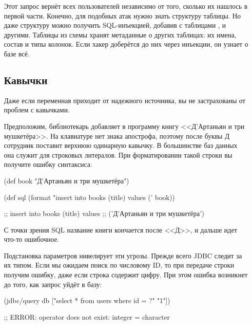 Этот запрос вернёт всех пользователей независимо от того, сколько их нашлось в первой части. Конечно, для подобных атак нужно знать структуру таблицы. Но даже структуру можно получить SQL-инъекцией, добавив  с таблицами ,  и другими. Таблицы из схемы  хранят метаданные о других таблицах: их имена, состав и типы колонок. Если хакер доберётся до них через инъекции, он узнает о базе всё.

\iflarge\vspace{3mm}\fi

\subsection{Кавычки}


Даже если переменная приходит от надежного источника, вы не застрахованы от проблем с кавычками.

Предположим, библиотекарь добавляет в программу книгу <<Д’Артаньян и три мушкетёра>>. На клавиатуре нет знака апострофа, поэтому после буквы Д сотрудник поставит верхнюю одинарную кавычку. В большинстве баз данных она служит для строковых литералов. При форматировании такой строки вы получите ошибку синтаксиса:

  \begin{clojure}
(def book "Д'Артаньян и три мушкетёра")

(def sql
  (format "insert into books (title) values ('%
          book))

;; insert into books (title) values
;; ('Д'Артаньян и три мушкетёра')
  \end{clojure}

С точки зрения SQL название книги кончается после <<Д>>, и дальше идет что-то ошибочное.

Подстановка параметров нивелирует эти угрозы. Прежде всего JDBC следит за их типом. Если мы ожидаем поиск по числовому ID, то при передаче строки получим ошибку, даже если строка содержит цифру. При этом ошибка возникнет до того, как запрос уйдёт в базу:

\begin{english}
  \begin{clojure}
(jdbc/query db ["select * from users where id = ?" "1"])

;; ERROR: operator does not exist: integer = character
  \end{clojure}
\end{english}

